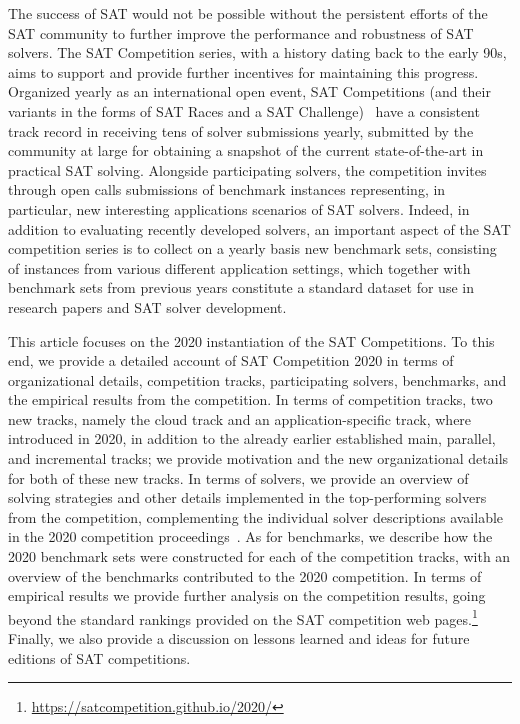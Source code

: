 \documentclass{elsarticle}
\begin{document}
The success of SAT would not be possible without the persistent efforts of the SAT community to further improve the performance and robustness
of SAT solvers. The SAT Competition series, with a history dating back to the early 90s, aims to support and provide further incentives 
for maintaining this progress. Organized yearly as an international open event, SAT Competitions (and their variants
in the forms of SAT Races and a SAT Challenge)~\cite{DBLP:journals/amai/SimonBH05,DBLP:conf/sat/BerreS03,DBLP:conf/sat/BerreS04,DBLP:journals/aim/JarvisaloBRS12,DBLP:journals/ai/BalintBJS15,DBLP:conf/aaai/BalyoHJ17,DBLP:journals/jsat/HeuleJS19}
 have a consistent track record in receiving tens of solver submissions yearly, submitted
by the community at large for obtaining a snapshot of the current state-of-the-art in practical SAT solving. Alongside participating solvers,
the competition invites through open calls submissions of benchmark instances representing, in particular, new interesting applications 
scenarios of SAT solvers. Indeed, in addition to evaluating recently developed solvers, an important aspect of the SAT competition series is
to collect on a yearly basis new benchmark sets, consisting of instances from various different application settings, which together with benchmark sets from previous years constitute a standard dataset for use in research papers and SAT solver development. 

This article focuses on the 2020 instantiation of the SAT Competitions. 
To this end, we provide
a detailed account of SAT Competition 2020 in terms of organizational details, competition tracks,
participating solvers, benchmarks, and the empirical results from the competition.
In terms of competition tracks, two new tracks, namely the cloud track and an application-specific track, where introduced in 2020,
in addition to the already earlier established main, parallel, and incremental tracks; we
provide motivation and the new organizational details for both of these new tracks.
In terms of solvers, we provide an overview of solving strategies and other details implemented in the top-performing solvers
from the competition, complementing the individual solver descriptions available in the 2020 competition proceedings~\cite{SC2020}.
 As for benchmarks, we describe how the 2020 benchmark sets were constructed for each of the competition tracks, with 
an overview of the benchmarks contributed to the 2020 competition.
In terms of empirical results we provide further analysis on the competition results, going beyond the standard rankings provided
on the SAT competition web pages.\footnote{\url{https://satcompetition.github.io/2020/}}
Finally, we also provide a discussion on lessons learned and ideas for future editions of SAT competitions.
\end{document}

